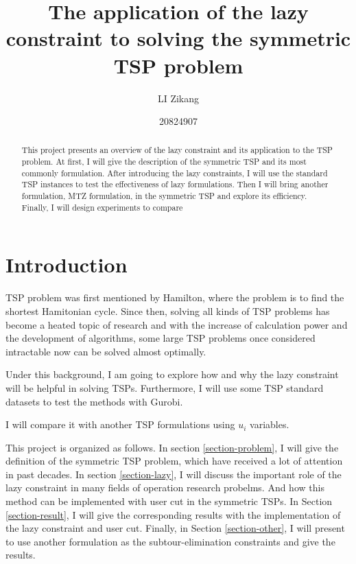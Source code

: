 \documentclass[12pt,letterpaper]{article}
\title{The application of the lazy constraint to solving the symmetric TSP problem}
\author{LI Zikang \and 20824907}
\date{}
\begin{document}
\maketitle

\begin{abstract}
This project presents an overview of the lazy constraint and its application to the TSP problem. At first, I will give the description of the symmetric TSP and its most commonly formulation. After introducing the lazy constraints, I will use the standard TSP instances to test the effectiveness of lazy formulations.
Then I will bring another formulation, MTZ formulation, in the symmetric TSP and explore its efficiency.
Finally, I will design  experiments to compare

\end{abstract}

\section{Introduction}\label{section-introduction}

TSP problem was first mentioned by Hamilton, where the problem is to find the shortest Hamitonian cycle. Since then, solving all kinds of TSP problems has become a heated topic of research and with the increase of calculation power and the development of algorithms, some large TSP problems once considered intractable now can be solved almost optimally.\cite{pearce2019towards}

Under this background, I am going to explore how and why the lazy constraint will be helpful in solving TSPs. Furthermore, I will use some TSP standard datasets to test the methods with Gurobi.

I will compare it with another TSP formulations using $u_i$ variables.


This project is organized as follows. In section \ref{section-problem}, I will give the definition of the symmetric TSP problem, which have received a lot of attention in past decades. In section \ref{section-lazy}, I will discuss the important role of the lazy constraint in many fields of operation research probelms. And how this method can be implemented with user cut in the symmetric TSPs. In Section \ref{section-result}, I will give the corresponding results with the implementation of the lazy constraint and user cut. Finally, in Section \ref{section-other}, I will present to use another formulation as the subtour-elimination constraints and give the results.
\end{document}
